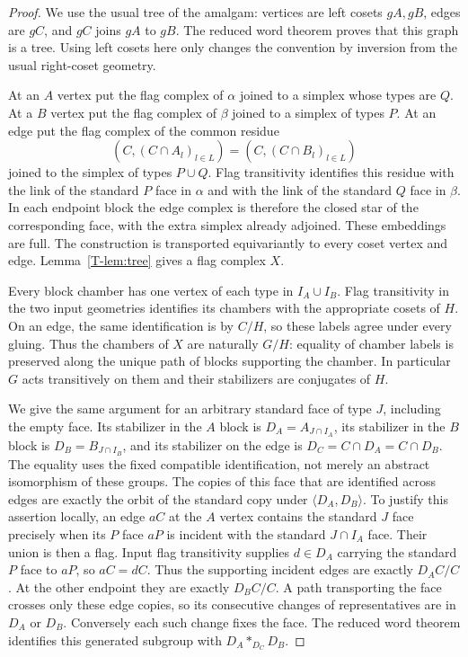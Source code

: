 \begin{proof}
We use the usual tree of the amalgam: vertices are left cosets $gA,gB$,
edges are $gC$, and $gC$ joins $gA$ to $gB$. The reduced word theorem
proves that this graph is a tree. Using left cosets here only changes
the convention by inversion from the usual right-coset geometry.

At an $A$ vertex put the flag complex of $\alpha$ joined to a simplex
whose types are $Q$. At a $B$ vertex put the flag complex of $\beta$
joined to a simplex of types $P$. At an edge put the flag complex of
the common residue
\[
 (C,(C\cap A_l)_{l\in L})=(C,(C\cap B_l)_{l\in L})
\]
joined to the simplex of types $P\cup Q$. Flag transitivity identifies
this residue with the link of the standard $P$ face in $\alpha$ and
with the link of the standard $Q$ face in $\beta$. In each endpoint
block the edge complex is therefore the closed star of the corresponding
face, with the extra simplex already adjoined. These embeddings are full.
The construction is transported equivariantly to every coset vertex
and edge. Lemma~\ref{T-lem:tree} gives a flag complex $X$.

Every block chamber has one vertex of each type in $I_A\cup I_B$.
Flag transitivity in the two input geometries identifies its chambers
with the appropriate cosets of $H$. On an edge, the same identification
is by $C/H$, so these labels agree under every gluing. Thus the chambers
of $X$ are naturally $G/H$: equality of chamber labels is preserved
along the unique path of blocks supporting the chamber. In particular
$G$ acts transitively on them and their stabilizers are conjugates of $H$.

We give the same argument for an arbitrary standard face of type $J$,
including the empty face. Its stabilizer in the $A$ block is
$D_A=A_{J\cap I_A}$, its stabilizer in the $B$ block is
$D_B=B_{J\cap I_B}$, and its stabilizer on the edge is
$D_C=C\cap D_A=C\cap D_B$. The equality uses the fixed compatible
identification, not merely an abstract isomorphism of these groups.
The copies of this face that are identified across edges are exactly
the orbit of the standard copy under $\langle D_A,D_B\rangle$.
To justify this assertion locally, an edge $aC$ at the $A$ vertex
contains the standard $J$ face precisely when its $P$ face $aP$ is
incident with the standard $J\cap I_A$ face. Their union is then a
flag. Input flag transitivity supplies $d\in D_A$ carrying the
standard $P$ face to $aP$, so $aC=dC$. Thus the supporting incident
edges are exactly $D_A C/C$. At the other endpoint they are exactly
$D_B C/C$. A path transporting the face crosses only these edge
copies, so its consecutive changes of representatives are in $D_A$ or $D_B$.
Conversely each such change fixes the face. The reduced word theorem
identifies this generated subgroup with $D_A*_{D_C}D_B$.


\end{proof}
